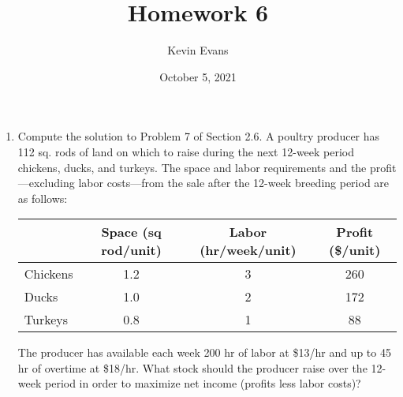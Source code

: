\documentclass{homework}
\title{Homework 6}
\author{Kevin Evans}
\date{October 5, 2021}
\newcommand{\bolditem}[1][YYY]{\item[\textbf{#1}]}
\begin{document}
	\maketitle
	\begin{enumerate}
		\bolditem[3.5.9] Compute the solution to Problem 7 of Section 2.6. A poultry producer has 112 sq. rods of land on which to raise during the next 12-week period chickens, ducks, and turkeys. The space and labor requirements and the profit---excluding labor costs---from the sale after the 12-week breeding period are as follows: \begin{center}
			\begin{tabular}{lccc}
				\toprule
				& Space (sq rod/unit) & Labor (hr/week/unit) & Profit (\$/unit) \\
				\midrule
				Chickens & 1.2 & 3 & 260 \\
				Ducks & 1.0 & 2 & 172 \\
				Turkeys & 0.8 & 1 & 88 \\ \bottomrule
			\end{tabular}
		\end{center}
		The producer has available each week 200 hr of labor at \$13/hr and up to 45 hr of overtime at \$18/hr. What stock should the producer raise over the 12-week period in order to maximize net income (profits less labor costs)?
		

\end{enumerate}
\end{document}
